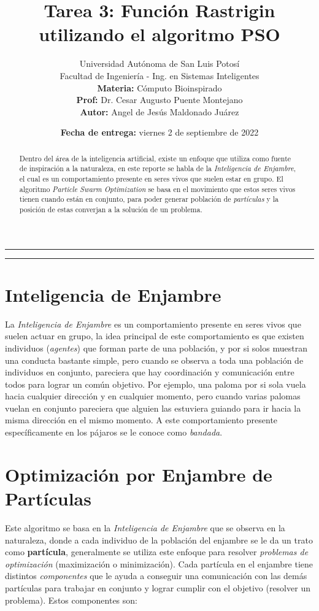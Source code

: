 \documentclass[12pt, a4paper]{article}
\title{\vspace{-3cm}Tarea 3: Función Rastrigin utilizando el algoritmo PSO}
\author{
    Universidad Autónoma de San Luis Potosí\\ 
    Facultad de Ingeniería - Ing. en Sistemas Inteligentes\\ 
    \textbf{Materia:} Cómputo Bioinspirado \\
    \textbf{Prof:} Dr. Cesar Augusto Puente Montejano  \\
    \textbf{Autor:} Angel de Jesús Maldonado Juárez
}
\date{\textbf{Fecha de entrega:} viernes 2 de septiembre de 2022}
\begin{document}
    \maketitle
    
    \begin{center}
        \rule{\textwidth}{0.5pt}
        \begin{abstract}
            \noindent Dentro del área de la inteligencia artificial, existe un enfoque que utiliza como fuente de inspiración a la naturaleza, en este reporte se habla de la \emph{Inteligencia de Enjambre}, el cual es un comportamiento presente en seres vivos que suelen estar en grupo. El algoritmo \emph{Particle Swarm Optimization} se basa en el movimiento que estos seres vivos tienen cuando están en conjunto, para poder generar población de \emph{partículas} y la posición de estas converjan a la solución de un problema. 
        \end{abstract}
        \rule{\textwidth}{0.5pt}
    \end{center}
    
    \section{Inteligencia de Enjambre}\label{title1}
        La \emph{Inteligencia de Enjambre} es un comportamiento presente en seres vivos que suelen actuar en grupo, la idea principal de este comportamiento es que existen individuos (\emph{agentes}) que forman parte de una población, y por si solos muestran una conducta bastante simple, pero cuando se observa a toda una población de individuos en conjunto, pareciera que hay coordinación y comunicación entre todos para lograr un común objetivo. Por ejemplo, una paloma por si sola vuela hacia cualquier dirección y en cualquier momento, pero cuando varias palomas vuelan en conjunto pareciera que alguien las estuviera guiando para ir hacia la misma dirección en el mismo momento. A este comportamiento presente específicamente en los pájaros se le conoce como \emph{bandada}.
    
    \section{Optimización por Enjambre de Partículas}
        Este algoritmo se basa en la \emph{Inteligencia de Enjambre} que se observa en la naturaleza, donde a cada individuo de la población del enjambre se le da un trato como \textbf{partícula}, generalmente se utiliza este enfoque para resolver \emph{problemas de optimización} (maximización  o minimización). Cada partícula en el enjambre tiene distintos \emph{componentes} que le ayuda a conseguir una comunicación con las demás partículas para trabajar en conjunto y lograr cumplir con el objetivo (resolver un problema). Estos componentes son:
\end{document}

